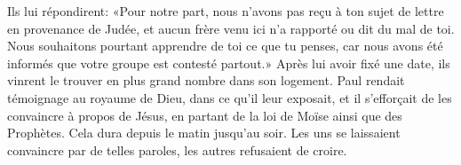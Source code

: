 Ils lui répondirent:
	«Pour notre part, nous n’avons pas reçu à ton sujet de lettre en provenance de Judée,
	et aucun frère venu ici n’a rapporté ou dit du mal de toi.
Nous souhaitons pourtant apprendre de toi ce que tu penses,
	car nous avons été informés que votre groupe est contesté partout.»
Après lui avoir fixé une date,
	ils vinrent le trouver en plus grand nombre dans son logement.
Paul rendait témoignage au royaume de Dieu, dans ce qu’il leur exposait,
	et il s’efforçait de les convaincre à propos de Jésus,
	en partant de la loi de Moïse ainsi que des Prophètes.
Cela dura depuis le matin jusqu’au soir.
	Les uns se laissaient convaincre par de telles paroles,
	les autres refusaient de croire.
